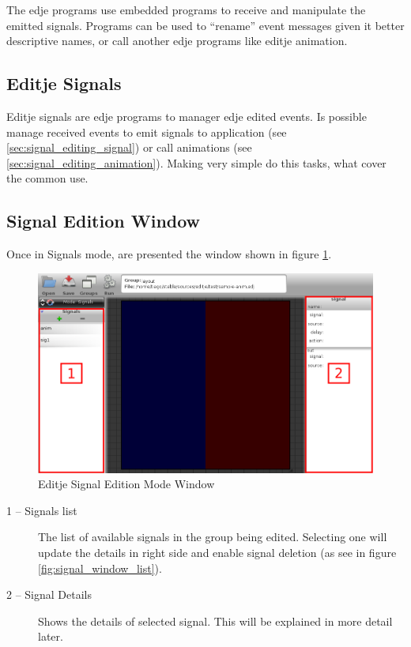 \documentclass[a4paper]{profusion}
\begin{document}
The edje programs use embedded programs to receive and manipulate the
emitted signals. Programs can be used to ``rename'' event messages
given it better descriptive names, or call another edje programs like
editje animation.

\subsection{Editje Signals}

Editje signals are edje programs to manager edje edited events. Is
possible manage received events to emit signals to application (see
\ref{sec:signal_editing_signal}) or call animations (see
\ref{sec:signal_editing_animation}). Making very simple do this tasks,
what cover the common use.

\subsection{Signal Edition Window}

Once in Signals mode, are presented the window shown in figure
\ref{fig:signal_window}.

\begin{figure}
 \centering
 \includegraphics[width=1.0\textwidth]{./images/signal_win.png}
 \caption{Editje Signal Edition Mode Window}
 \label{fig:signal_window}
\end{figure}

\begin{description}
\item[1 -- Signals list] The list of available signals in the group
  being edited. Selecting one will update the details in right side
  and enable signal deletion (as see in figure
  \ref{fig:signal_window_list}).
\item[2 -- Signal Details] Shows the details of selected signal. This
  will be explained in more detail later.
\end{description}
\end{document}
